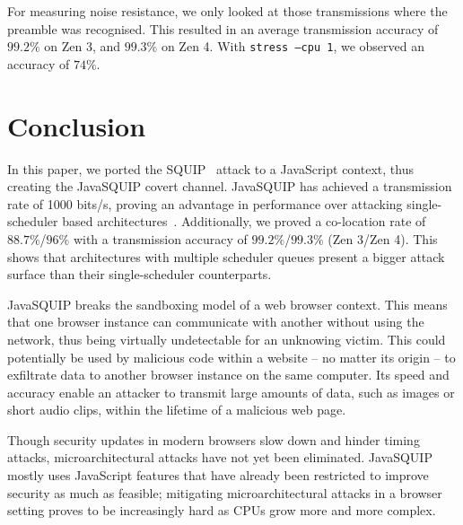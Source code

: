 \documentclass[11pt,
  titlepage=false,
]{scrreprt}
\begin{document}
For measuring noise resistance, we only looked at those transmissions where the preamble was recognised.
This resulted in an average transmission accuracy of $99.2\%$ on Zen 3, and $99.3\%$ on Zen 4.
With \texttt{stress --cpu 1}, we observed an accuracy of $74\%$.



\chapter{Conclusion}
\label{ch:conclusion}
In this paper, we ported the SQUIP~\cite{squip} attack to a JavaScript context, thus creating the JavaSQUIP covert channel.
JavaSQUIP has achieved a transmission rate of 1000 bits/s, proving an advantage in performance over attacking single-scheduler based architectures~\cite{Rokicki2022webport}.
Additionally, we proved a co-location rate of $88.7\%$/$96\%$ with a transmission accuracy of $99.2\%$/$99.3\%$ (Zen 3/Zen 4).
This shows that architectures with multiple scheduler queues present a bigger attack surface than their single-scheduler counterparts.

JavaSQUIP breaks the sandboxing model of a web browser context.
This means that one browser instance can communicate with another without using the network, thus being virtually undetectable for an unknowing victim.
This could potentially be used by malicious code within a website -- no matter its origin -- to exfiltrate data to another browser instance on the same computer.
Its speed and accuracy enable an attacker to transmit large amounts of data, such as images or short audio clips, within the lifetime of a malicious web page.

Though security updates in modern browsers slow down and hinder timing attacks, microarchitectural attacks have not yet been eliminated.
JavaSQUIP mostly uses JavaScript features that have already been restricted to improve security as much as feasible;
mitigating microarchitectural attacks in a browser setting proves to be increasingly hard as CPUs grow more and more complex.



\printbibliography
\end{document}
